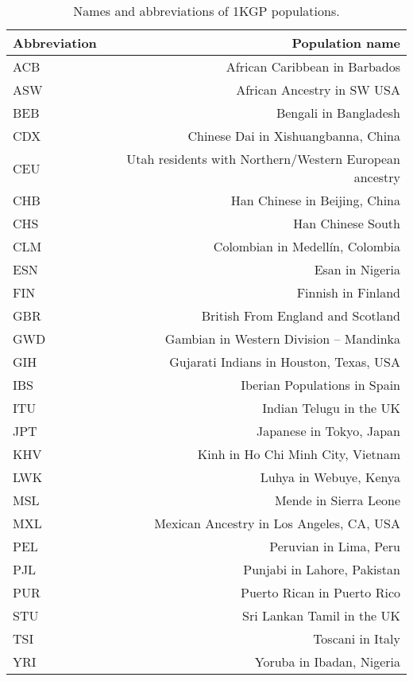 \begin{table}[ht]
\centering
\begin{tabular}{l|r}
Abbreviation & Population name\\
\hline
 ACB & African Caribbean in Barbados\\
 \hline
    ASW & African Ancestry in SW USA \\
 \hline
    BEB & Bengali in Bangladesh\\
 \hline
    CDX & Chinese Dai in Xishuangbanna, China\\
 \hline
    CEU & Utah residents with Northern/Western European ancestry\\
 \hline
    CHB & Han Chinese in Beijing, China\\
 \hline
    CHS & Han Chinese South\\
 \hline
    CLM & Colombian in Medell\'{i}n, Colombia\\
 \hline
    ESN & Esan in Nigeria\\
 \hline
    FIN & Finnish in Finland\\
 \hline
    GBR & British From England and Scotland\\
 \hline
    GWD & Gambian in Western Division -- Mandinka\\
 \hline
    GIH & Gujarati Indians in Houston, Texas, USA\\
 \hline
    IBS & Iberian Populations in Spain\\
 \hline
    ITU & Indian Telugu in the UK\\
 \hline
    JPT & Japanese in Tokyo, Japan\\
 \hline
    KHV & Kinh in Ho Chi Minh City, Vietnam\\
 \hline
    LWK & Luhya in Webuye, Kenya\\
 \hline
    MSL & Mende in Sierra Leone\\
 \hline
    MXL & Mexican Ancestry in Los Angeles, CA, USA\\
 \hline
    PEL & Peruvian in Lima, Peru\\
 \hline
    PJL & Punjabi in Lahore, Pakistan\\
 \hline
    PUR & Puerto Rican in Puerto Rico\\
 \hline
    STU & Sri Lankan Tamil in the UK\\
 \hline
    TSI & Toscani in Italy\\
 \hline
    YRI & Yoruba in Ibadan, Nigeria\\
\end{tabular}
\caption{Names and abbreviations of 1KGP populations.}
\label{table:1kgp_labels} 
\end{table} 

